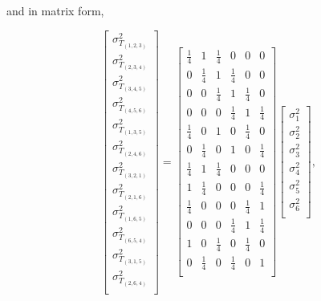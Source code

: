 and in matrix form,

\begin{equation}
  \left[\begin{array}{c}
      \sigma_{T_{(1,2,3)}}^2 \\
      \sigma_{T_{(2,3,4)}}^2 \\
      \sigma_{T_{(3,4,5)}}^2 \\
      \sigma_{T_{(4,5,6)}}^2 \\
      \sigma_{T_{(1,3,5)}}^2 \\
      \sigma_{T_{(2,4,6)}}^2 \\

      \sigma_{T_{(3,2,1)}}^2 \\
      \sigma_{T_{(2,1,6)}}^2 \\
      \sigma_{T_{(1,6,5)}}^2 \\
      \sigma_{T_{(6,5,4)}}^2 \\
      \sigma_{T_{(3,1,5)}}^2 \\
      \sigma_{T_{(2,6,4)}}^2 \\
    \end{array}
    \right]
  = \left[ \begin{array}{cccccc}
      \frac{1}{4} & 1 & \frac{1}{4} & 0 & 0 & 0 \\
      0 & \frac{1}{4} & 1 & \frac{1}{4} & 0 & 0 \\
      0 & 0 & \frac{1}{4} & 1 & \frac{1}{4} & 0 \\
      0 & 0 & 0 & \frac{1}{4} & 1 & \frac{1}{4} \\
      \frac{1}{4} & 0 & 1 & 0 & \frac{1}{4} & 0 \\
      0 & \frac{1}{4} & 0 & 1 & 0 & \frac{1}{4}\\

      \frac{1}{4} & 1 & \frac{1}{4} & 0 & 0 & 0 \\
      1 & \frac{1}{4} & 0 & 0 & 0 & \frac{1}{4} \\
      \frac{1}{4} & 0 & 0 & 0 & \frac{1}{4} & 1 \\
      0 & 0 & 0 & \frac{1}{4} & 1 & \frac{1}{4} \\
      1 & 0 & \frac{1}{4} & 0 & \frac{1}{4} & 0 \\
      0 & \frac{1}{4} & 0 & \frac{1}{4} & 0 & 1 \\
    \end{array}
    \right]
  \left[
    \begin{array}{c}
      \sigma_1^2 \\
      \sigma_2^2 \\
      \sigma_3^2 \\
      \sigma_4^2 \\
      \sigma_5^2 \\
      \sigma_6^2 \\
    \end{array}
    \right],
\end{equation}

